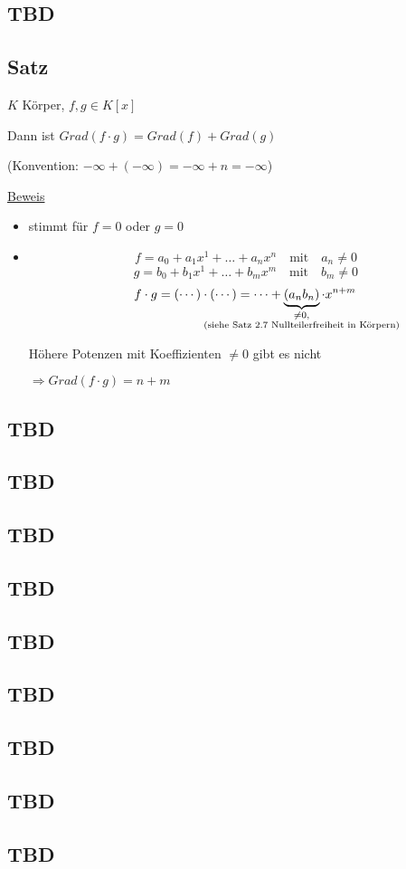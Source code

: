 \subsection{TBD}
\subsection{Satz}
\label{sub:satz}

$K$ Körper, $f,g \in K[x]$

Dann ist $Grad(f\cdot g) = Grad(f) + Grad(g)$

(Konvention: $-\infty + (-\infty) = -\infty + n = -\infty$)

\par\bigskip
\underline{Beweis}

\begin{itemize}
	\item
	stimmt für $f = 0$ oder $g = 0$
	
	\item
	\[f = a_0 + a_1x^1 + \ldots +  a_nx^n \quad \text{mit} \quad  a_n \neq 0\]
	\[g = b_0 + b_1x^1 + \ldots +  b_mx^m \quad \text{mit} \quad  b_m \neq 0\]
	\[f \cdot g = (\cdots) \cdot (\cdots) = \cdots + \underbrace{(a_nb_n)}_ {\mathclap{\substack{\neq 0, \\ \text{(siehe Satz 2.7
					Nullteilerfreiheit in Körpern)}}}}\cdot x^{n+m}\]
	
	Höhere Potenzen mit Koeffizienten $\neq 0$ gibt es nicht
	
	$\Rightarrow Grad(f \cdot g) = n + m$
\end{itemize}

\subsection{TBD}

\subsection{TBD}

\subsection{TBD}

\subsection{TBD}

\subsection{TBD}

\subsection{TBD}

\subsection{TBD}

\subsection{TBD}

\subsection{TBD}